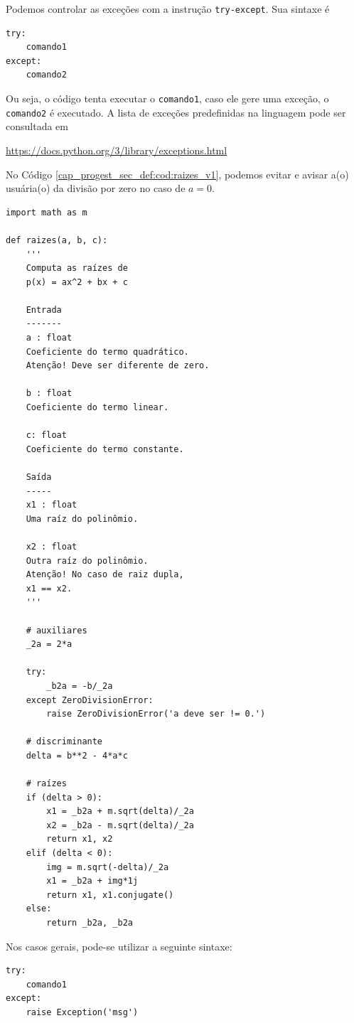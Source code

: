 Podemos controlar as exceções com a instrução \lstinline+try-except+. Sua sintaxe é
\begin{lstlisting}
try:
    comando1
except:
    comando2
\end{lstlisting}
Ou seja, o código tenta executar o \lstinline+comando1+, caso ele gere uma exceção, o \lstinline+comando2+ é executado. A lista de exceções predefinidas na linguagem pode ser consultada em
\begin{center}
  \url{https://docs.python.org/3/library/exceptions.html}
\end{center}

\begin{ex}
  No Código \ref{cap_progest_sec_def:cod:raizes_v1}, podemos evitar e avisar a(o) usuária(o) da divisão por zero no caso de $a=0$.
\begin{lstlisting}[caption=raizes\_v2.py]
import math as m

def raizes(a, b, c):
    '''
    Computa as raízes de
    p(x) = ax^2 + bx + c

    Entrada
    -------
    a : float
    Coeficiente do termo quadrático.
    Atenção! Deve ser diferente de zero.

    b : float 
    Coeficiente do termo linear.

    c: float
    Coeficiente do termo constante.

    Saída
    -----
    x1 : float
    Uma raíz do polinômio.

    x2 : float
    Outra raíz do polinômio.
    Atenção! No caso de raiz dupla,
    x1 == x2.
    '''

    # auxiliares
    _2a = 2*a

    try:
        _b2a = -b/_2a
    except ZeroDivisionError:
        raise ZeroDivisionError('a deve ser != 0.')

    # discriminante
    delta = b**2 - 4*a*c

    # raízes
    if (delta > 0):
        x1 = _b2a + m.sqrt(delta)/_2a
        x2 = _b2a - m.sqrt(delta)/_2a
        return x1, x2
    elif (delta < 0):
        img = m.sqrt(-delta)/_2a
        x1 = _b2a + img*1j
        return x1, x1.conjugate()
    else:
        return _b2a, _b2a
\end{lstlisting}
\end{ex}

\begin{obs}
  Nos casos gerais, pode-se utilizar a seguinte sintaxe:
\begin{lstlisting}
try:
    comando1
except:
    raise Exception('msg')
\end{lstlisting}
\end{obs}

